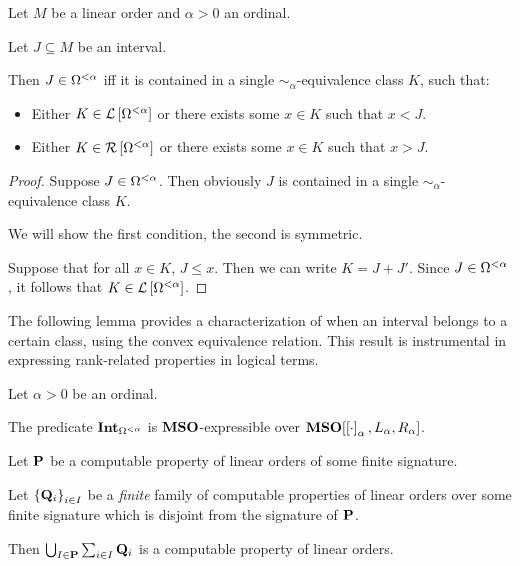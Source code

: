 \begin{lemma}\label{alpha-expressible}
  Let $M$ be a linear order and $\alpha > 0$ an ordinal.

  Let $J \subseteq M$ be an interval.

  Then $J \in \Omega^{< \alpha}$ iff
  it is contained in a single $\sim_{\alpha}$-equivalence class $K$, such that:
  \begin{itemize}
    \item Either $K \in \mathcal{L} \left[ {{\Omega^{< \alpha}}} \right]$ or
          there exists some $x \in K$ such that $x < J$.
    \item Either $K \in \mathcal{R} \left[ {{\Omega^{< \alpha}}} \right]$ or
          there exists some $x \in K$ such that $x > J$.
  \end{itemize}
\end{lemma}

\begin{proof}
  Suppose $J \in \Omega^{< \alpha}$.
  Then obviously $J$ is contained in a single $\sim_{\alpha}$-equivalence class $K$.

  We will show the first condition, the second is symmetric.

  Suppose that for all $x \in K$, $J \le x$.
  Then we can write $K = J + J'$.
  Since $J \in \Omega^{< \alpha}$, it follows that $K \in \mathcal{L} \left[ {{\Omega^{< \alpha}}} \right]$.
\end{proof}

The following lemma provides a characterization of when an interval belongs to a certain class, using the convex
equivalence relation. This result is instrumental in expressing rank-related properties in logical terms.

\begin{corollary}\label{int-expressible}
  Let $\alpha > 0$ be an ordinal.

  The predicate $\mathbf{Int}_{\Omega^{< \alpha}}$ is $\mathbf{MSO}$-expressible over
  $\mathbf{MSO}[\left[ {\cdot} \right]_{\alpha}, L_{\alpha}, R_{\alpha}]$.
\end{corollary}

\begin{theorem}\label{computable-sum}
  Let $\mathbf{P}$ be a computable property of linear orders of some finite signature.

  Let $\left\{ {\mathbf{Q}_i} \right\}_{i \in I}$ be a \emph{finite} family of computable properties of linear orders
  over some finite signature which is disjoint from the signature of $\mathbf{P}$.

  Then $\bigcup_{I \in \mathbf{P}} \sum_{i \in I} \mathbf{Q}_{i}$ is a computable property of linear orders.
\end{theorem}

